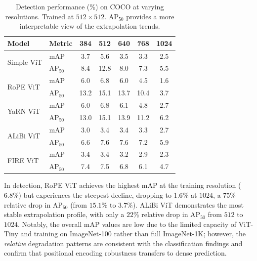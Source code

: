 \begin{table}[t]
\centering
\caption{Detection performance (\%) on COCO at varying resolutions. Trained at $512 \times 512$. AP$_{50}$ provides a more interpretable view of the extrapolation trends.}
\label{tab:detection_map}
\small
\begin{tabular}{ll|ccccc}
\toprule
\textbf{Model} & \textbf{Metric} & \textbf{384} & \textbf{512} & \textbf{640} & \textbf{768} & \textbf{1024} \\
\midrule
\multirow{2}{*}{Simple ViT} & mAP & 3.7 & 5.6 & 3.5 & 3.3 & 2.5 \\
                            & AP$_{50}$ & 8.4 & 12.8 & 8.0 & 7.3 & 5.5 \\
\midrule
\multirow{2}{*}{RoPE ViT}   & mAP & 6.0 & 6.8 & 6.0 & 4.5 & 1.6 \\
                            & AP$_{50}$ & 13.2 & 15.1 & 13.7 & 10.4 & 3.7 \\
\midrule
\multirow{2}{*}{YaRN ViT}   & mAP & 6.0 & 6.8 & 6.1 & 4.8 & 2.7 \\
                            & AP$_{50}$ & 13.0 & 15.1 & 13.9 & 11.2 & 6.2 \\
\midrule
\multirow{2}{*}{ALiBi ViT}  & mAP & 3.0 & 3.4 & 3.4 & 3.3 & 2.7 \\
                            & AP$_{50}$ & 6.6 & 7.6 & 7.6 & 7.2 & 5.9 \\
\midrule
\multirow{2}{*}{FIRE ViT}   & mAP & 3.4 & 3.4 & 3.2 & 2.9 & 2.3 \\
                            & AP$_{50}$ & 7.4 & 7.5 & 6.8 & 6.1 & 4.7 \\
\bottomrule
\end{tabular}
\end{table}

In detection, RoPE ViT achieves the highest mAP at the training resolution ($6.8\%$) but
experiences the steepest decline, dropping to $1.6\%$ at $1024$, a $75\%$ relative drop in AP$_{50}$ (from $15.1\%$ to $3.7\%$). ALiBi ViT demonstrates the
most stable extrapolation profile, with only a $22\%$ relative drop in AP$_{50}$ from $512$ to $1024$. Notably, the
overall mAP values are low due to the limited capacity of ViT-Tiny and training on ImageNet-100
rather than full ImageNet-1K; however, the \emph{relative} degradation patterns are consistent with
the classification findings and confirm that positional encoding robustness transfers to dense
prediction.

